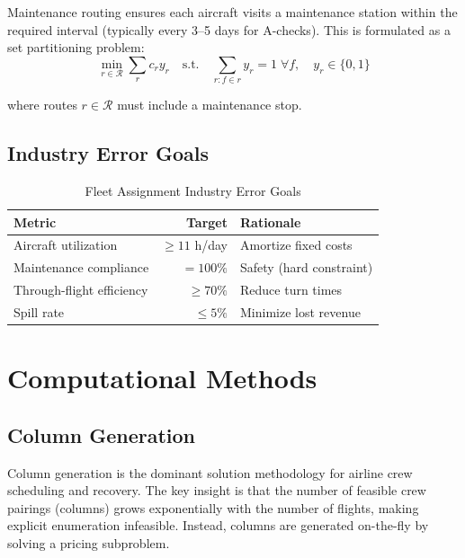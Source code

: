 \documentclass[11pt,a4paper]{book}
\theoremstyle{definition}
\begin{document}
Maintenance routing ensures each aircraft visits a maintenance station
within the required interval (typically every 3--5 days for A-checks).
This is formulated as a set partitioning problem:
\begin{equation}
  \min_{r \in \mathcal{R}} \sum_r c_r y_r \quad
  \text{s.t.} \quad \sum_{r: f \in r} y_r = 1 \;\forall f,\quad
  y_r \in \{0,1\}
\end{equation}

where routes $r \in \mathcal{R}$ must include a maintenance stop.

\section{Industry Error Goals}

\begin{table}[h]
\centering
\caption{Fleet Assignment Industry Error Goals}
\label{tab:fleet-goals}
\begin{tabular}{lrl}
\toprule
\textbf{Metric} & \textbf{Target} & \textbf{Rationale} \\
\midrule
Aircraft utilization & $\geq 11$ h/day & Amortize fixed costs \\
Maintenance compliance & $= 100\%$ & Safety (hard constraint) \\
Through-flight efficiency & $\geq 70\%$ & Reduce turn times \\
Spill rate & $\leq 5\%$ & Minimize lost revenue \\
\bottomrule
\end{tabular}
\end{table}


\chapter{Computational Methods}

\section{Column Generation}

Column generation is the dominant solution methodology for airline crew
scheduling and recovery. The key insight is that the number of feasible
crew pairings (columns) grows exponentially with the number of flights,
making explicit enumeration infeasible. Instead, columns are generated
on-the-fly by solving a pricing subproblem.
\end{document}
